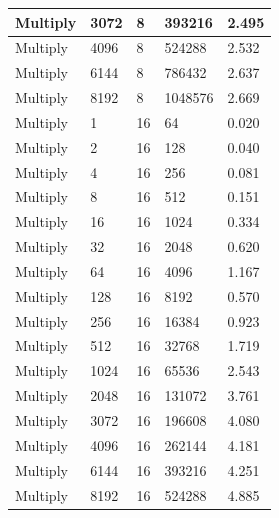 \documentclass{article}
\begin{document}
\begin{longtable}{|l|l|l|l|l|}
Multiply           & 3072 & 8           & 393216            & 2.495             \\ \hline
Multiply           & 4096 & 8           & 524288            & 2.532             \\ \hline
Multiply           & 6144 & 8           & 786432            & 2.637             \\ \hline
Multiply           & 8192 & 8           & 1048576           & 2.669             \\ \hline
Multiply           & 1    & 16          & 64                & 0.020             \\ \hline
Multiply           & 2    & 16          & 128               & 0.040             \\ \hline
Multiply           & 4    & 16          & 256               & 0.081             \\ \hline
Multiply           & 8    & 16          & 512               & 0.151             \\ \hline
Multiply           & 16   & 16          & 1024              & 0.334             \\ \hline
Multiply           & 32   & 16          & 2048              & 0.620             \\ \hline
Multiply           & 64   & 16          & 4096              & 1.167             \\ \hline
Multiply           & 128  & 16          & 8192              & 0.570             \\ \hline
Multiply           & 256  & 16          & 16384             & 0.923             \\ \hline
Multiply           & 512  & 16          & 32768             & 1.719             \\ \hline
Multiply           & 1024 & 16          & 65536             & 2.543             \\ \hline
Multiply           & 2048 & 16          & 131072            & 3.761             \\ \hline
Multiply           & 3072 & 16          & 196608            & 4.080             \\ \hline
Multiply           & 4096 & 16          & 262144            & 4.181             \\ \hline
Multiply           & 6144 & 16          & 393216            & 4.251             \\ \hline
Multiply           & 8192 & 16          & 524288            & 4.885             \\ \hline

\end{longtable}
\end{document}
